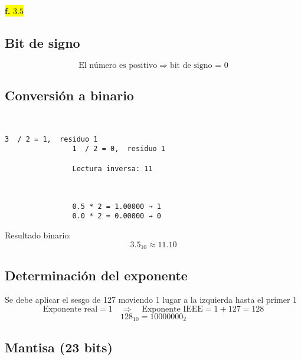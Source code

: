\documentclass[a4paper,12pt]{article}
\begin{document}
	\begin{center}	
		\colorbox{yellow}{{\textbf{f.} $3.5$}}
		
		\subsection*{Bit de signo}
		
		\[
		\text{El número es positivo} \Rightarrow \text{bit de signo = } \boxed{0}
		\]
		
		\subsection*{Conversión a binario}
		~~~~~~~
		\begin{center}
			\begin{Verbatim}[formatcom=\centering]
				3  / 2 = 1,  residuo 1
				1  / 2 = 0,  residuo 1
				
				Lectura inversa: 11
			\end{Verbatim}
		\end{center}
		
		
		~~~~~~~~~
		
		\begin{center}
			\begin{Verbatim}
				0.5 * 2 = 1.00000 → 1 
				0.0 * 2 = 0.00000 → 0 
			\end{Verbatim}
		\end{center}
		
		Resultado binario: 
		\[
		3.5_{10} \approx 11.10
		\]
		
		\subsection*{Determinación del exponente}
		
		Se debe aplicar el sesgo de 127 moviendo 1 lugar a la izquierda hasta el primer 1
		\vspace{-0.5em}
		\[
		\text{Exponente real} = 1 \quad \Rightarrow \quad \text{Exponente IEEE} = 1 + 127 = 128
		\]
		\vspace{-0.5em}
		\[
		128_{10} = 10000000_2
		\]
		
		\subsection*{Mantisa (23 bits)}
		

\end{center}
\end{document}
